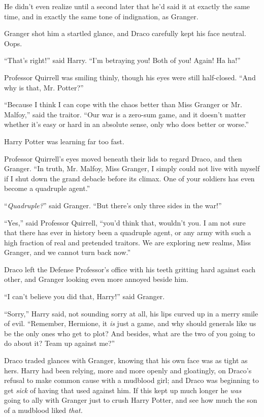 He didn't even realize until a second later that he'd said it at exactly the same time, and in exactly the same tone of indignation, as Granger.

Granger shot him a startled glance, and Draco carefully kept his face neutral. Oops.

``That's right!'' said Harry. ``I'm betraying you! Both of you! Again! Ha ha!''

Professor Quirrell was smiling thinly, though his eyes were still half-closed. ``And why is that, Mr. Potter?''

``Because I think I can cope with the chaos better than Miss Granger or Mr. Malfoy,'' said the traitor. ``Our war is a zero-sum game, and it doesn't matter whether it's easy or hard in an absolute sense, only who does better or worse.''

Harry Potter was learning far too fast.

Professor Quirrell's eyes moved beneath their lids to regard Draco, and then Granger. ``In truth, Mr. Malfoy, Miss Granger, I simply could not live with myself if I shut down the grand debacle before its climax. One of your soldiers has even become a quadruple agent.''

``\emph{Quadruple?}'' said Granger. ``But there's only three sides in the war!''

``Yes,'' said Professor Quirrell, ``you'd think that, wouldn't you. I am not sure that there has ever in history been a quadruple agent, or any army with such a high fraction of real and pretended traitors. We are exploring new realms, Miss Granger, and we cannot turn back now.''

Draco left the Defense Professor's office with his teeth gritting hard against each other, and Granger looking even more annoyed beside him.

``I can't believe you did that, Harry!'' said Granger.

``Sorry,'' Harry said, not sounding sorry at all, his lips curved up in a merry smile of evil. ``Remember, Hermione, it \emph{is} just a game, and why should generals like us be the only ones who get to plot? And besides, what are the two of you going to do about it? Team up against me?''

Draco traded glances with Granger, knowing that his own face was as tight as hers. Harry had been relying, more and more openly and gloatingly, on Draco's refusal to make common cause with a mudblood girl; and Draco was beginning to get \emph{sick} of having that used against him. If this kept up much longer he \emph{was} going to ally with Granger just to crush Harry Potter, and see how much the son of a mudblood liked \emph{that.}


